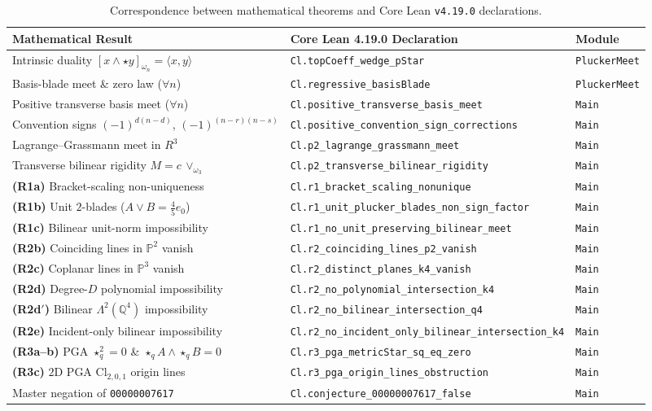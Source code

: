 \documentclass[11pt]{article}
\theoremstyle{definition}
\newcommand{\Cl}{\mathrm{Cl}}
\newcommand{\Psp}{\mathbb{P}}
\begin{document}
\begin{table}[ht]
\centering
\footnotesize
\setlength{\tabcolsep}{4pt}
\begin{tabular}{@{}lll@{}}
\toprule
\textbf{Mathematical Result} & \textbf{Core Lean 4.19.0 Declaration} & \textbf{Module} \\
\midrule
Intrinsic duality $[x \wedge \star y]_{\omega_n} = \langle x, y \rangle$ & \texttt{Cl.topCoeff\_wedge\_pStar} & \texttt{PluckerMeet} \\
Basis-blade meet \& zero law ($\forall n$) & \texttt{Cl.regressive\_basisBlade} & \texttt{PluckerMeet} \\
Positive transverse basis meet ($\forall n$) & \texttt{Cl.positive\_transverse\_basis\_meet} & \texttt{Main} \\
Convention signs $(-1)^{d(n-d)}$, $(-1)^{(n-r)(n-s)}$ & \texttt{Cl.positive\_convention\_sign\_corrections} & \texttt{Main} \\
Lagrange--Grassmann meet in $R^3$ & \texttt{Cl.p2\_lagrange\_grassmann\_meet} & \texttt{Main} \\
Transverse bilinear rigidity $M = c\,\vee_{\omega_3}$ & \texttt{Cl.p2\_transverse\_bilinear\_rigidity} & \texttt{Main} \\
\textbf{(R1a)} Bracket-scaling non-uniqueness & \texttt{Cl.r1\_bracket\_scaling\_nonunique} & \texttt{Main} \\
\textbf{(R1b)} Unit $2$-blades ($A \vee B = \frac{4}{5}e_0$) & \texttt{Cl.r1\_unit\_plucker\_blades\_non\_sign\_factor} & \texttt{Main} \\
\textbf{(R1c)} Bilinear unit-norm impossibility & \texttt{Cl.r1\_no\_unit\_preserving\_bilinear\_meet} & \texttt{Main} \\
\textbf{(R2b)} Coinciding lines in $\Psp^2$ vanish & \texttt{Cl.r2\_coinciding\_lines\_p2\_vanish} & \texttt{Main} \\
\textbf{(R2c)} Coplanar lines in $\Psp^3$ vanish & \texttt{Cl.r2\_distinct\_planes\_k4\_vanish} & \texttt{Main} \\
\textbf{(R2d)} Degree-$D$ polynomial impossibility & \texttt{Cl.r2\_no\_polynomial\_intersection\_k4} & \texttt{Main} \\
\textbf{(R2d$'$)} Bilinear $\Lambda^2(\mathbb{Q}^4)$ impossibility & \texttt{Cl.r2\_no\_bilinear\_intersection\_q4} & \texttt{Main} \\
\textbf{(R2e)} Incident-only bilinear impossibility & \texttt{Cl.r2\_no\_incident\_only\_bilinear\_intersection\_k4} & \texttt{Main} \\
\textbf{(R3a--b)} PGA $\star_q^2 = 0$ \& $\star_q A \wedge \star_q B = 0$ & \texttt{Cl.r3\_pga\_metricStar\_sq\_eq\_zero} & \texttt{Main} \\
\textbf{(R3c)} $2$D PGA $\Cl_{2,0,1}$ origin lines & \texttt{Cl.r3\_pga\_origin\_lines\_obstruction} & \texttt{Main} \\
Master negation of \texttt{00000007617} & \texttt{Cl.conjecture\_00000007617\_false} & \texttt{Main} \\
\bottomrule
\end{tabular}
\caption{Correspondence between mathematical theorems and Core Lean \texttt{v4.19.0} declarations.}
\label{tab:lean}
\end{table}
\end{document}
